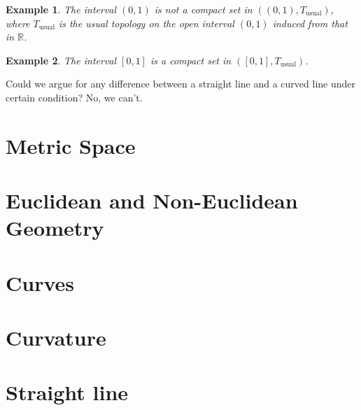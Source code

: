 \documentclass[12pt]{article}
\newtheorem*{example}{Example}
\begin{document}
    \begin{example}
        The interval $(0,1)$ is not a compact set in $((0,1),T_{\textrm{usual}})$, where $T_{\textrm{usual}}$ is the usual topology on the open interval $(0,1)$ induced from that in $\mathbb{R}$.
    \end{example}

    \begin{example}
        The interval $[0,1]$ is a compact set in $([0,1],T_{\textrm{usual}})$.
    \end{example}

    Could we argue for any difference between a straight line and a curved line under certain condition? No, we can't.

    \section{Metric Space}

    \section{Euclidean and Non-Euclidean Geometry}

    \section{Curves}

    \section{Curvature}

    \section{Straight line}
    
\end{document}
